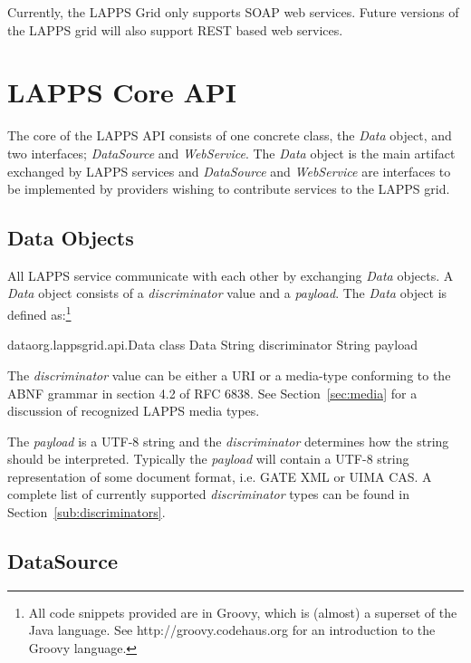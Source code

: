 \documentclass{article}
\newcommand{\lapps}{LAPPS\xspace}
\newcommand{\data}{\emph{Data}\xspace}
\newcommand{\source}{\emph{DataSource}\xspace}
\newcommand{\service}{\emph{WebService}\xspace}
\renewcommand{\tt}[1]{\texttt{#1}}
\begin{document}
Currently, the \lapps Grid only supports SOAP\cite{soap} web services. Future versions of the \lapps grid will also support REST based web services.


\section{LAPPS Core API}

The core of the \lapps  API consists of one concrete class, the \data  object, and two interfaces; \source and \service.  The \data object is the main artifact exchanged by \lapps services and \source and \service are interfaces to be implemented by providers wishing to contribute services to the \lapps grid.  

\subsection{Data Objects}
All \lapps service communicate with each other by exchanging \data objects.  A \data object consists of a \emph{discriminator} value and a \emph{payload}.  The \data object is defined as:\footnote{All code snippets provided are in Groovy, which is (almost) a superset of the Java language.  See http://groovy.codehaus.org for an introduction to the Groovy language.}

\begin{groovy}{data}{org.lappsgrid.api.Data}
	class Data {
		String discriminator
		String payload
	}
\end{groovy}

The \emph{discriminator} value can be either a URI or a media-type conforming to the ABNF grammar in section 4.2 of RFC 6838\cite{rfc6838}. See Section~\ref{sec:media} for a discussion of recognized \lapps media types.

The \emph{payload} is a UTF-8 string and the \emph{discriminator} determines how the string should be interpreted.  Typically the \emph{payload} will contain a UTF-8 string representation of some document format, i.e. GATE XML or UIMA CAS.  A complete list of currently supported \emph{discriminator} types can be found in Section~\ref{sub:discriminators}. 


\subsection{DataSource}
\end{document}
